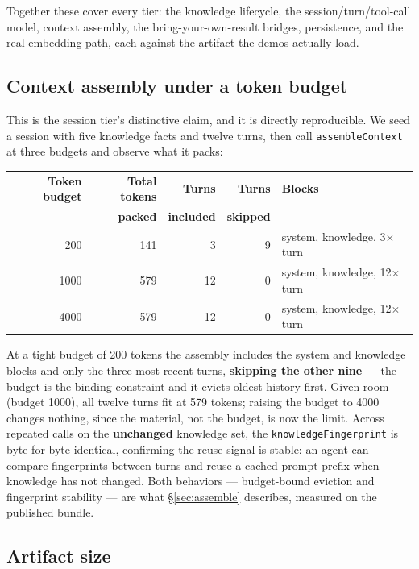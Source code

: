 \documentclass[11pt]{article}
\newcommand{\code}[1]{\texttt{#1}}
\begin{document}
Together these cover every tier: the knowledge lifecycle, the
session/turn/tool-call model, context assembly, the bring-your-own-result bridges,
persistence, and the real embedding path, each against the artifact the demos
actually load.

\subsection{Context assembly under a token budget}

This is the session tier's distinctive claim, and it is directly reproducible. We
seed a session with five knowledge facts and twelve turns, then call
\code{assembleContext} at three budgets and observe what it packs:

\begin{table}[htbp]
  \centering
  \begin{tabular}{r r r r l}
    \toprule
    \textbf{Token budget} & \textbf{Total tokens} & \textbf{Turns} & \textbf{Turns} & \textbf{Blocks} \\
                          & \textbf{packed}       & \textbf{included} & \textbf{skipped} & \\
    \midrule
    200  & 141 & 3  & 9 & system, knowledge, 3$\times$ turn \\
    1000 & 579 & 12 & 0 & system, knowledge, 12$\times$ turn \\
    4000 & 579 & 12 & 0 & system, knowledge, 12$\times$ turn \\
    \bottomrule
  \end{tabular}
\end{table}

At a tight budget of 200 tokens the assembly includes the system and knowledge
blocks and only the three most recent turns, \textbf{skipping the other nine} ---
the budget is the binding constraint and it evicts oldest history first. Given room
(budget 1000), all twelve turns fit at 579 tokens; raising the budget to 4000
changes nothing, since the material, not the budget, is now the limit. Across
repeated calls on the \textbf{unchanged} knowledge set, the
\code{knowledgeFingerprint} is byte-for-byte identical, confirming the reuse signal
is stable: an agent can compare fingerprints between turns and reuse a cached prompt
prefix when knowledge has not changed. Both behaviors --- budget-bound eviction and
fingerprint stability --- are what \S\ref{sec:assemble} describes, measured on the
published bundle.

\subsection{Artifact size}
\end{document}
